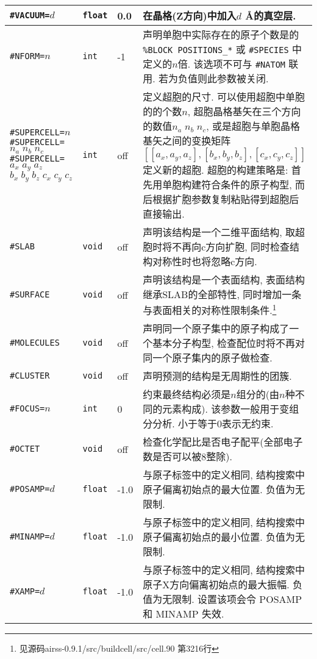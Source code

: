 \documentclass[a4paper, 10pt]{article}
\begin{document}
\begin{center}
\begin{longtable}{m{11em}|m{4em}<{\centering}|m{3em}<{\centering}|m{15em}}
\midrule
\verb|#VACUUM=|\(d\) & \verb|float| & 0.0 & 在晶格(Z方向)中加入\(d\) \r{A}的真空层.\\
\midrule
\verb|#NFORM=|\(n\) & \verb|int| & -1 & 声明单胞中实际存在的原子个数是的 \verb|%BLOCK POSITIONS_*| 或 \verb|#SPECIES| 中定义的\(n\)倍. 该选项不可与 \verb|#NATOM| 联用. 若为负值则此参数被关闭.\\
\midrule
\verb|#SUPERCELL=|\(n\) \verb|#SUPERCELL=|\(n_a\;n_b\;n_c\;\;\;\;\;\;\) \hspace{2em}\verb|#SUPERCELL=|\(a_x\; a_y\;a_z\;\)\hspace{2em} \(b_x\;b_y\;b_z\;c_x\;c_y\;c_z\) & \verb|int| & off & 定义超胞的尺寸. 可以使用超胞中单胞的的个数\(n\), 超胞晶格基矢在三个方向的数值\(n_a\;n_b\;n_c\), 或是超胞与单胞晶格基矢之间的变换矩阵\([[a_x,a_y,a_z],[b_x,b_y,b_z],[c_x,c_y,c_z]]\)定义新的超胞. 超胞的构建策略是: 首先用单胞构建符合条件的原子构型, 而后根据扩胞参数复制粘贴得到超胞后直接输出.\\
\midrule
\verb|#SLAB| & \verb|void| & off & 声明该结构是一个二维平面结构, 取超胞时将不再向c方向扩胞, 同时检查结构对称性时也将忽略c方向.\\
\midrule
\verb|#SURFACE| & \verb|void| & off & 声明该结构是一个表面结构, 表面结构继承SLAB的全部特性, 同时增加一条与表面相关的对称性限制条件.\footnote{见源码airss-0.9.1/src/buildcell/src/cell.90 第3216行}\\
\midrule
\verb|#MOLECULES|& \verb|void| & off & 声明同一个原子集中的原子构成了一个基本分子构型, 检查配位时将不再对同一个原子集内的原子做检查.\\
\midrule
\verb|#CLUSTER| & \verb|void| & off & 声明预测的结构是无周期性的团簇.\\
\midrule
\verb|#FOCUS=|\(n\) & \verb|int| & 0 & 约束最终结构必须是\(n\)组分的(由\(n\)种不同的元素构成). 该参数一般用于变组分分析. 小于等于0表示无约束.\\
\midrule
\verb|#OCTET|& \verb|void| & off & 检查化学配比是否电子配平(全部电子数是否可以被8整除).\\
\midrule
\verb|#POSAMP=|\(d\) & \verb|float|  & -1.0 & 与原子标签中的定义相同, 结构搜索中原子偏离初始点的最大位置. 负值为无限制.\\
\midrule
\verb|#MINAMP=|\(d\) & \verb|float| & -1.0 & 与原子标签中的定义相同, 结构搜索中原子偏离初始点的最小位置. 负值为无限制.\\
\midrule
\verb|#XAMP=|\(d\) & \verb|float| & -1.0 & 与原子标签中的定义相同, 结构搜索中原子X方向偏离初始点的最大振幅. 负值为无限制. 设置该项会令 POSAMP 和 MINAMP 失效. \\
\midrule

\end{longtable}
\end{center}
\end{document}
